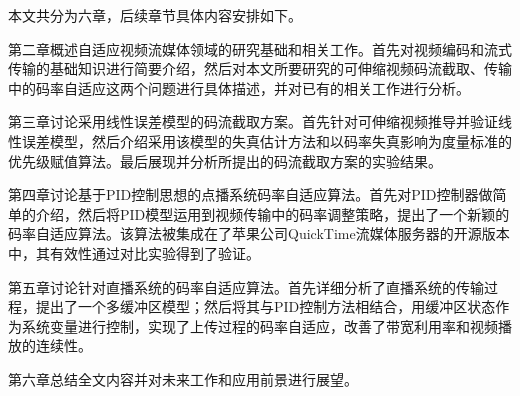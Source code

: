 本文共分为六章，后续章节具体内容安排如下。

第二章概述自适应视频流媒体领域的研究基础和相关工作。首先对视频编码和流式传输的基础知识进行简要介绍，然后对本文所要研究的可伸缩视频码流截取、传输中的码率自适应这两个问题进行具体描述，并对已有的相关工作进行分析。

第三章讨论采用线性误差模型的码流截取方案。首先针对可伸缩视频推导并验证线性误差模型，然后介绍采用该模型的失真估计方法和以码率失真影响为度量标准的优先级赋值算法。最后展现并分析所提出的码流截取方案的实验结果。

第四章讨论基于PID控制思想的点播系统码率自适应算法。首先对PID控制器做简单的介绍，然后将PID模型运用到视频传输中的码率调整策略，提出了一个新颖的码率自适应算法。该算法被集成在了苹果公司QuickTime流媒体服务器的开源版本中，其有效性通过对比实验得到了验证。

第五章讨论针对直播系统的码率自适应算法。首先详细分析了直播系统的传输过程，提出了一个多缓冲区模型；然后将其与PID控制方法相结合，用缓冲区状态作为系统变量进行控制，实现了上传过程的码率自适应，改善了带宽利用率和视频播放的连续性。

第六章总结全文内容并对未来工作和应用前景进行展望。